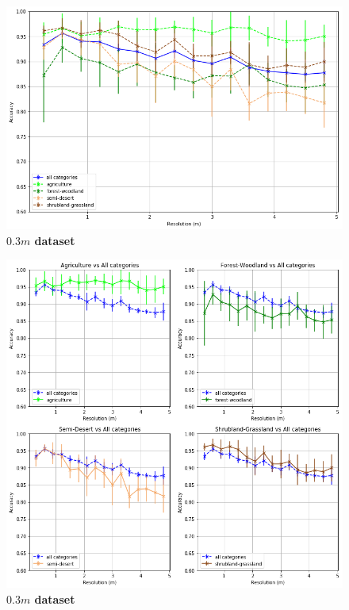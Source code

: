 \begin{figure}[h!]
	\centering
	\includegraphics[width=\textwidth]{Figures/results/acc_res_all_categories_03m.png}
	\captionsetup{width=1\linewidth}
	\caption{\textbf{$0.3m$ dataset}}
	\label{fig:acc_all_cat_03m}
\end{figure}

\begin{figure}[h!]
	\centering
	\includegraphics[width=\textwidth]{Figures/results/acc_res_by_category_03m.png}
	\captionsetup{width=1\linewidth}
	\caption{\textbf{$0.3m$ dataset}}
	\label{fig:acc_by_cat_03m}
\end{figure}


